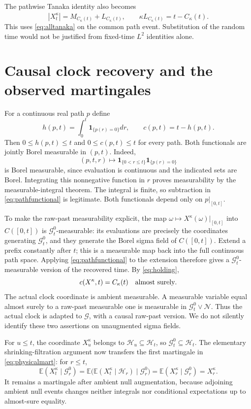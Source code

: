 \documentclass[11pt]{article}
\newcommand{\E}{\mathbb E}
\newcommand{\ind}{\mathbf1}
\newcommand{\G}{\mathcal G}
\newcommand{\N}{\mathcal N}
\begin{document}
The pathwise Tanaka identity also becomes
\[
 |X_t^\kappa|=\widehat M_{C_\kappa(t)}+L_{C_\kappa(t)},
 \qquad \kappa L_{C_\kappa(t)}=t-C_\kappa(t).
\]
This uses \eqref{eq:alltanaka} on the common path event. Substitution
of the random time would not be justified from fixed-time
$L^2$ identities alone.

\section{Causal clock recovery and the observed martingales}
For a continuous real path $p$ define
\begin{equation}\label{eq:pathfunctional}
 h(p,t)=\int_0^t\ind_{\{p(r)=0\}}dr,\qquad
 c(p,t)=t-h(p,t).
\end{equation}
Then $0\leq h(p,t)\leq t$ and $0\leq c(p,t)\leq t$ for every
path. Both functionals are jointly Borel measurable in $(p,t)$.
Indeed,
\[
 (p,t,r)\longmapsto
 \ind_{\{0<r\leq t\}}\ind_{\{p(r)=0\}}
\]
is Borel measurable, since evaluation is continuous and the indicated
sets are Borel. Integrating this nonnegative function in $r$ proves
measurability by the measurable-integral theorem. The integral is
finite, so subtraction in \eqref{eq:pathfunctional} is legitimate.
Both functionals depend only on $p|_{[0,t]}$.

To make the raw-past measurability explicit, the map
$\omega\mapsto X^\kappa(\omega)|_{[0,t]}$ into $C([0,t])$ is
$\G_t^0$-measurable: its evaluations are precisely the coordinates
generating $\G_t^0$, and they generate the Borel sigma field of
$C([0,t])$. Extend a prefix constantly after $t$; this is a measurable
map back into the full continuous path space. Applying
\eqref{eq:pathfunctional} to the extension therefore gives a
$\G_t^0$-measurable version of the recovered time. By
\eqref{eq:holding},
\begin{equation}\label{eq:recovery}
 c(X^\kappa,t)=C_\kappa(t)\quad\hbox{almost surely}.
\end{equation}
The actual clock coordinate is ambient measurable. A measurable
variable equal almost surely to a raw-past measurable one is
measurable in $\G_t^0\vee\N$. Thus the actual clock is adapted to
$\G$, with a causal raw-past version. We do not silently identify
these two assertions on unaugmented sigma fields.

For $u\leq t$, the coordinate $X_u^\kappa$ belongs to
$\mathcal H_u\subseteq\mathcal H_t$, so
$\G_t^0\subseteq\mathcal H_t$. The elementary shrinking-filtration
argument now transfers the first martingale in
\eqref{eq:physicalmart}: for $r\leq t$,
\[
 \E(X_t^\kappa\mid\G_r^0)
 =\E\bigl(\E(X_t^\kappa\mid\mathcal H_r)\mid\G_r^0\bigr)
 =\E(X_r^\kappa\mid\G_r^0)=X_r^\kappa.
\]
It remains a martingale after ambient null augmentation, because
adjoining ambient null events changes neither integrals nor
conditional expectations up to almost-sure equality.
\end{document}
